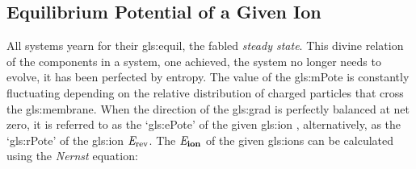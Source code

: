 \documentclass[class={myRUCProject}, crop=false]{standalone}
\begin{document}
\subsection{Equilibrium Potential of a Given Ion}
\begingroup
\allowdisplaybreaks
All systems yearn for their \gls{gls:equil}, the fabled \textit{steady state}. This divine relation of the components in a system, one achieved, the system no longer needs to evolve, it has been perfected by entropy. 
The value of the \gls{gls:mPote} is constantly fluctuating depending on the relative distribution of charged particles that cross the \gls{gls:membrane}. 
When the direction of the \gls{gls:grad} is perfectly balanced at net zero, it is referred to as the `\gls{gls:ePote}' of the given \gls{gls:ion} \br{\equilibria\ion}, alternatively, as the `\gls{gls:rPote}' of the \gls{gls:ion} \(\mathit{E}_\mathrm{rev}\). 
The \(\mathit{E}_\mathbf{ion}\) of the given \glspl{gls:ion} can be calculated using the \textit{Nernst} equation:
\end{document}
